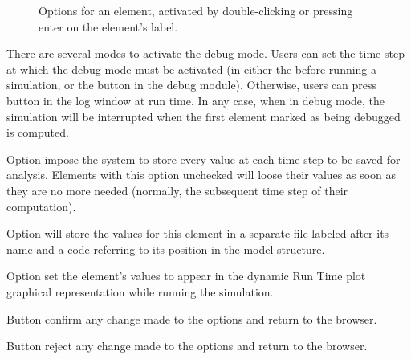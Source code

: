 \documentclass [11pt,a4paper] {book}
\begin{document}
\begin{figure}[ht]
  \centering
  \caption{Options for an element, activated by double-clicking or pressing enter on the element's label.}
  \label{fig:element_opt}
\end{figure}



There are several modes to activate the debug mode. Users can set the time step at which the debug mode must be activated (in either the  before running a simulation, or the button  in the debug module). Otherwise, users can press button  in the log window at run time. In any case, when in debug mode, the simulation will be interrupted when the first element marked as being debugged is computed.

Option  impose the system to store every value at each time step to be saved for analysis. Elements with this option unchecked will loose their values as soon as they are no more needed (normally, the subsequent time step of their computation).

Option  will store the values for this element in a separate file labeled after its name and a code referring to its position in the model structure.

Option  set the element's values to appear in the dynamic Run Time plot graphical representation while running the simulation.

Button  confirm any change made to the options and return to the browser.

Button  reject any change made to the options and return to the browser.
\end{document}
